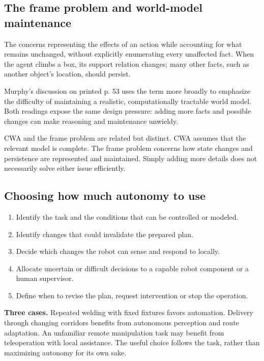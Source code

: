 \subsection{The frame problem and world-model maintenance}
The  concerns representing the effects of an action while accounting for what remains unchanged, without explicitly enumerating every unaffected fact. When the agent climbs a box, its support relation changes; many other facts, such as another object's location, should persist.

Murphy's discussion on printed p. 53 uses the term more broadly to emphasize the difficulty of maintaining a realistic, computationally tractable world model. Both readings expose the same design pressure: adding more facts and possible changes can make reasoning and maintenance unwieldy.

CWA and the frame problem are related but distinct. CWA assumes that the relevant model is complete. The frame problem concerns how state changes and persistence are represented and maintained. Simply adding more details does not necessarily solve either issue efficiently.

\subsection{Choosing how much autonomy to use}
\begin{enumerate}
\item Identify the task and the conditions that can be controlled or modeled.
\item Identify changes that could invalidate the prepared plan.
\item Decide which changes the robot can sense and respond to locally.
\item Allocate uncertain or difficult decisions to a capable robot component or a human supervisor.
\item Define when to revise the plan, request intervention or stop the operation.
\end{enumerate}
\textbf{Three cases.} Repeated welding with fixed fixtures favors automation. Delivery through changing corridors benefits from autonomous perception and route adaptation. An unfamiliar remote manipulation task may benefit from teleoperation with local assistance. The useful choice follows the task, rather than maximizing autonomy for its own sake.
